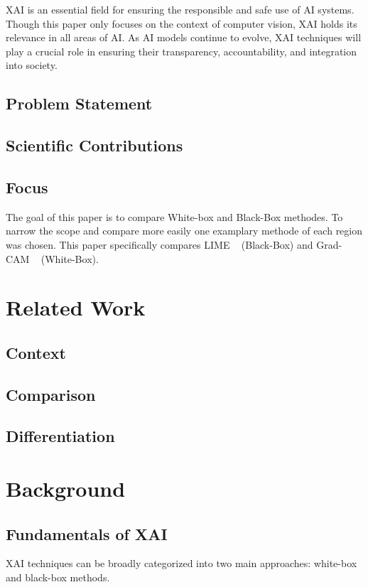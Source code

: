 \documentclass{article}
\begin{document}
XAI is an essential field for ensuring the responsible and safe use of AI systems. Though this paper only focuses on the context of computer vision, XAI holds its relevance in all areas of AI. As AI models continue to evolve, XAI techniques will play a crucial role in ensuring their transparency, accountability, and integration into society.



\subsection{Problem Statement}
\subsection{Scientific Contributions}

\subsection{Focus}
The goal of this paper is to compare White-box and Black-Box methodes. To narrow the scope and compare more easily one examplary methode of each region was chosen. This paper specifically compares LIME ~\cite{ribeiro2016why} (Black-Box) and Grad-CAM ~\cite{Selvaraju_2019} (White-Box).


\section{Related Work}
\subsection{Context}
\subsection{Comparison}
\subsection{Differentiation}

\section{Background}

\subsection{Fundamentals of XAI}
XAI techniques can be broadly categorized into two main approaches: white-box and black-box methods.
\end{document}
